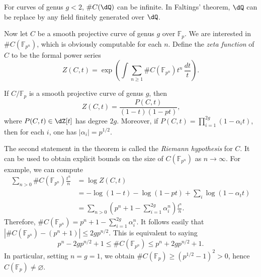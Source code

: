 \documentclass{article}
\begin{document}
For curves of genus $g<2$, $\# C(\dQ)$ can be infinite. In Faltings' 
theorem, $\dQ$ can be replace by any field finitely generated over 
$\dQ$. 

Now let $C$ be a smooth projective curve of genus $g$ over $\mathbb{F}_p$. 
We are interested in $\#C(\mathbb{F}_{p^n})$, which is obviously computable 
for each $n$. Define the \emph{zeta function} of $C$ to be the formal power 
series 
\[
  Z(C,t) = \exp\left( \int\sum_{n\geqslant 1} \# C(\mathbb{F}_{p^n}) t^n\, \frac{dt}{t}\right) \text{.}
\]

\begin{theorem}[Weil]\label{thm:Weil-curve}
If $C/\mathbb{F}_p$ is a smooth projective curve of genus $g$, then 
\[
  Z(C,t) = \frac{P(C,t)}{(1-t)(1-p t)} \text{,}
\]
where $P(C,t)\in \dZ[t]$ has degree $2 g$. Moreover, if 
$P(C,t) = \prod_{i=1}^{2 g} (1-\alpha_i t)$, then for each $i$, one has 
$|\alpha_i|=p^{1/2}$. 
\end{theorem}

The second statement in the theorem is called the \emph{Riemann hypothesis} 
for $C$. It can be used to obtain explicit bounds on the size of 
$C(\mathbb{F}_{p^n})$ as $n\to\infty$. For example, we can compute 
\begin{align*}
  \sum_{n>0} \# C(\mathbb{F}_{p^n}) \frac{t^n}{n} 
    &= \log Z(C,t) \\
    &= -\log(1-t) - \log(1-p t) + \sum_i \log(1-\alpha_t t) \\
    &= \sum_{n>0} \left(p^n+1-\sum_{i=1}^{2 g} \alpha_i^n\right) \frac{t^n}{n} \text{.}
\end{align*}
Therefore, $\# C(\mathbb{F}_{p^n}) = p^n+1-\sum_{i=1}^{2 g} \alpha_i^n$. It 
follows easily that $|\# C(\mathbb{F}_{p^n})-(p^n+1)| \leqslant 2 g p^{n/2}$. 
This is equivalent to saying 
\[
  p^n-2 g p^{n/2}+1 
    \leqslant \# C(\mathbb{F}_{p^n}) 
    \leqslant p^n + 2 g p^{n/2} + 1 \text{.}
\]
In particular, setting $n = g = 1$, we obtain 
$\# C(\mathbb{F}_p) \geqslant (p^{1/2}-1)^2>0$, hence 
$C(\mathbb{F}_p)\ne\varnothing$. 















\end{document}
